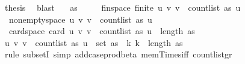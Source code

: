 \begin{isabellebody}
\ {\isacharquery}{\kern0pt}thesis\ \isamarkupfalse%
\ blast\isanewline
{}\isamarkupfalse%
%
\endisatagproof
{\isafoldproof}%
%
\isadelimproof
\isanewline
%
\endisadelimproof
\isanewline
{}\isamarkupfalse%
\isanewline
\ \ \ {\isachardoublequoteopen}as\ {\isasymnoteq}\ {\isacharbrackleft}{\kern0pt}{\isacharbrackright}{\kern0pt}{\isachardoublequoteclose}\isanewline
\ \ \ fin{\isacharunderscore}{\kern0pt}space{\isacharcolon}{\kern0pt}\ {\isachardoublequoteopen}finite\ {\isacharbraceleft}{\kern0pt}{\isacharparenleft}{\kern0pt}u{\isacharcomma}{\kern0pt}\ v{\isacharparenright}{\kern0pt}{\isachardot}{\kern0pt}\ v\ {\isacharless}{\kern0pt}\ count{\isacharunderscore}{\kern0pt}list\ as\ u{\isacharbraceright}{\kern0pt}{\isachardoublequoteclose}\ \isanewline
\ \ non{\isacharunderscore}{\kern0pt}empty{\isacharunderscore}{\kern0pt}space{\isacharcolon}{\kern0pt}\ {\isachardoublequoteopen}{\isacharbraceleft}{\kern0pt}{\isacharparenleft}{\kern0pt}u{\isacharcomma}{\kern0pt}\ v{\isacharparenright}{\kern0pt}{\isachardot}{\kern0pt}\ v\ {\isacharless}{\kern0pt}\ count{\isacharunderscore}{\kern0pt}list\ as\ u{\isacharbraceright}{\kern0pt}\ {\isasymnoteq}\ {\isacharbraceleft}{\kern0pt}{\isacharbraceright}{\kern0pt}{\isachardoublequoteclose}\ \isanewline
\ \ card{\isacharunderscore}{\kern0pt}space{\isacharcolon}{\kern0pt}\ {\isachardoublequoteopen}card\ {\isacharbraceleft}{\kern0pt}{\isacharparenleft}{\kern0pt}u{\isacharcomma}{\kern0pt}\ v{\isacharparenright}{\kern0pt}{\isachardot}{\kern0pt}\ v\ {\isacharless}{\kern0pt}\ count{\isacharunderscore}{\kern0pt}list\ as\ u{\isacharbraceright}{\kern0pt}\ {\isacharequal}{\kern0pt}\ length\ as{\isachardoublequoteclose}\isanewline
%
\isadelimproof
%
\endisadelimproof
%
\isatagproof
{}\isamarkupfalse%
\ {\isacharminus}{\kern0pt}\isanewline
\ \ \isamarkupfalse%
\ {\isachardoublequoteopen}{\isacharbraceleft}{\kern0pt}{\isacharparenleft}{\kern0pt}u{\isacharcomma}{\kern0pt}\ v{\isacharparenright}{\kern0pt}{\isachardot}{\kern0pt}\ v\ {\isacharless}{\kern0pt}\ count{\isacharunderscore}{\kern0pt}list\ as\ u{\isacharbraceright}{\kern0pt}\ {\isasymsubseteq}\ set\ as\ {\isasymtimes}\ {\isacharbraceleft}{\kern0pt}k{\isachardot}{\kern0pt}\ k\ {\isacharless}{\kern0pt}\ length\ as{\isacharbraceright}{\kern0pt}{\isachardoublequoteclose}\isanewline
\ \ \ \ \isamarkupfalse%
\ {\isacharparenleft}{\kern0pt}rule\ subsetI{\isacharcomma}{\kern0pt}\ simp\ add{\isacharcolon}{\kern0pt}case{\isacharunderscore}{\kern0pt}prod{\isacharunderscore}{\kern0pt}beta\ mem{\isacharunderscore}{\kern0pt}Times{\isacharunderscore}{\kern0pt}iff\ count{\isacharunderscore}{\kern0pt}list{\isacharunderscore}{\kern0pt}gr{\isacharunderscore}{\kern0pt}{}{\isacharparenright}{\kern0pt}\isanewline

\end{isabellebody}

